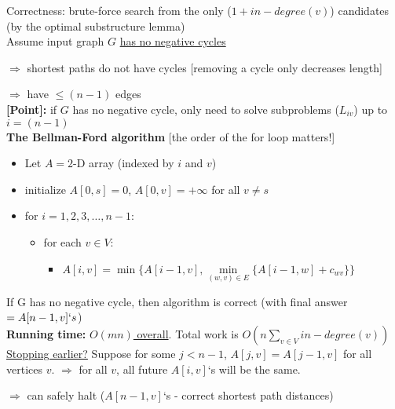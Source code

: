 \documentclass[a4paper,12pt]{article}
\theoremstyle{plain}
\theoremstyle{definition}
\theoremstyle{remark}
\begin{document}
Correctness: brute-force search from the only ($1 + in-degree(v)$) candidates (by the optimal substructure lemma)
\\

Assume input graph $G$ \underline{has no negative cycles}

$\Rightarrow$ shortest paths do not have cycles [removing a cycle only decreases length]

$\Rightarrow$ have $\leq (n-1)$ edges
\\

\textbf{[Point]:} if $G$ has no negative cycle, only need to solve subproblems ($L_{iv}$) up to $i = (n-1)$
\\

\textbf{The Bellman-Ford algorithm} [the order of the for loop matters!]
\begin{itemize}
	\item Let $A = 2$-D array (indexed by $i$ and $v$)
	\item initialize $A[0, s] = 0$, $A[0, v] = +\infty$ for all $v \neq s$
	\item for $i = 1, 2, 3, \dots, n-1$:
	\begin{itemize}
		\item for each $v \in V$:
		\begin{itemize}
			\item $A[i, v] = \min \{A[i-1, v], \min\limits_{(w,v) \in E} \{A[i-1, w] + c_{wv}\}\}$
		\end{itemize}
	\end{itemize}
\end{itemize}

If G has no negative cycle, then algorithm is correct (with final answer $= A[n-1, v]`s$)
\\

\textbf{Running time:} \underline{$O(mn)$ overall}. Total work is $O (n \sum\limits_{v \in V} in-degree(v))$
\\

\underline{Stopping earlier?} Suppose for some $j < n-1$, $A[j, v] = A[j-1, v]$ for all vertices $v$. $\Rightarrow$ for all $v$, all future $A[i, v]$`s will be the same.

$\Rightarrow$ can safely halt ($A[n-1, v]$`s - correct shortest path distances)
\end{document}

